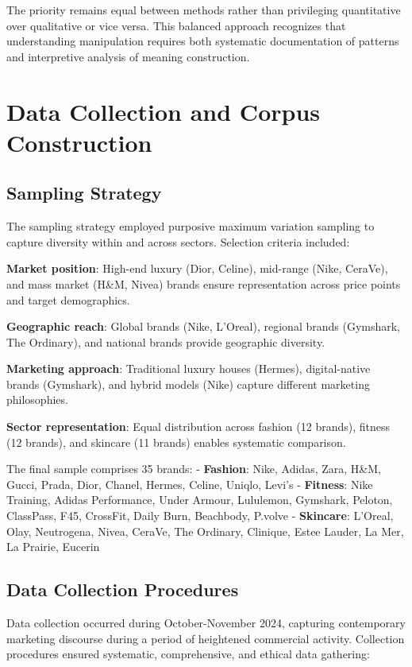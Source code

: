 The priority remains equal between methods rather than privileging quantitative over qualitative or vice versa. This balanced approach recognizes that understanding manipulation requires both systematic documentation of patterns and interpretive analysis of meaning construction.

\section{Data Collection and Corpus Construction}
\label{sec:data_collection}

\subsection{Sampling Strategy}

The sampling strategy employed purposive maximum variation sampling to capture diversity within and across sectors. Selection criteria included:

\textbf{Market position}: High-end luxury (Dior, Celine), mid-range (Nike, CeraVe), and mass market (H\&M, Nivea) brands ensure representation across price points and target demographics.

\textbf{Geographic reach}: Global brands (Nike, L'Oreal), regional brands (Gymshark, The Ordinary), and national brands provide geographic diversity.

\textbf{Marketing approach}: Traditional luxury houses (Hermes), digital-native brands (Gymshark), and hybrid models (Nike) capture different marketing philosophies.

\textbf{Sector representation}: Equal distribution across fashion (12 brands), fitness (12 brands), and skincare (11 brands) enables systematic comparison.

The final sample comprises 35 brands:
- \textbf{Fashion}: Nike, Adidas, Zara, H\&M, Gucci, Prada, Dior, Chanel, Hermes, Celine, Uniqlo, Levi's
- \textbf{Fitness}: Nike Training, Adidas Performance, Under Armour, Lululemon, Gymshark, Peloton, ClassPass, F45, CrossFit, Daily Burn, Beachbody, P.volve
- \textbf{Skincare}: L'Oreal, Olay, Neutrogena, Nivea, CeraVe, The Ordinary, Clinique, Estee Lauder, La Mer, La Prairie, Eucerin

\subsection{Data Collection Procedures}

Data collection occurred during October-November 2024, capturing contemporary marketing discourse during a period of heightened commercial activity. Collection procedures ensured systematic, comprehensive, and ethical data gathering:

